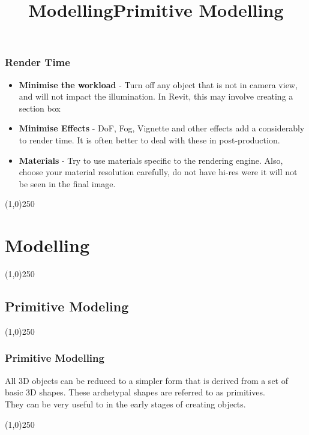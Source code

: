 \begin{frame}
\frametitle{Render Time}
\begin{itemize}
	\item \textbf{Minimise the workload} - Turn off any object that is not in camera view, and will not impact the illumination.  In Revit, this may involve creating a section box
	\item \textbf{Minimise Effects} - DoF, Fog, Vignette and other effects add a considerably to render time.  It is often better to deal with these in post-production.
	\item \textbf{Materials} - Try to use materials specific to the rendering engine.  Also, choose your material resolution carefully, do not have hi-res were it will not be seen in the final image.
\end{itemize}

\end{frame}
\begin{center}\line(1,0){250}\end{center}













\section{Modelling}
\begin{frame}
	\title[Modelling]{Modelling}
	\titlepage
\end{frame}\begin{center}\line(1,0){250}\end{center}


\subsection{Primitive Modeling}
\begin{frame}
\title[Primitive Modelling]{Primitive Modelling}
\titlepage
\end{frame}\begin{center}\line(1,0){250}\end{center}



\begin{frame}
\frametitle{Primitive Modelling}
All 3D objects can be reduced to a simpler form that is derived from a set of basic 3D shapes.  These archetypal shapes are referred to as primitives.\\

They can be very useful to in the early stages of creating objects. 

\end{frame}
\begin{center}\line(1,0){250}\end{center}



